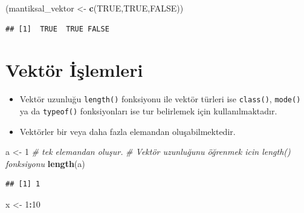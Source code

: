 \documentclass[
  oneside]{book}
\newenvironment{Shaded}{\begin{snugshade}}{\end{snugshade}}
\newcommand{\CommentTok}[1]{\textcolor[rgb]{0.56,0.35,0.01}{\textit{#1}}}
\newcommand{\ConstantTok}[1]{\textcolor[rgb]{0.56,0.35,0.01}{#1}}
\newcommand{\DecValTok}[1]{\textcolor[rgb]{0.00,0.00,0.81}{#1}}
\newcommand{\FunctionTok}[1]{\textcolor[rgb]{0.13,0.29,0.53}{\textbf{#1}}}
\newcommand{\NormalTok}[1]{#1}
\newcommand{\OtherTok}[1]{\textcolor[rgb]{0.56,0.35,0.01}{#1}}
\newcommand{\SpecialCharTok}[1]{\textcolor[rgb]{0.81,0.36,0.00}{\textbf{#1}}}
\begin{document}
\begin{Shaded}
\begin{Highlighting}[]
\NormalTok{(mantiksal\_vektor }\OtherTok{\textless{}{-}} \FunctionTok{c}\NormalTok{(}\ConstantTok{TRUE}\NormalTok{,}\ConstantTok{TRUE}\NormalTok{,}\ConstantTok{FALSE}\NormalTok{))}
\end{Highlighting}
\end{Shaded}

\begin{verbatim}
## [1]  TRUE  TRUE FALSE
\end{verbatim}

\hypertarget{vektuxf6r-iux15flemleri}{%
\section{Vektör İşlemleri}\label{vektuxf6r-iux15flemleri}}

\begin{itemize}
\item
  Vektör uzunluğu \texttt{length()} fonksiyonu ile vektör türleri ise \texttt{class()}, \texttt{mode()} ya da \texttt{typeof()} fonksiyonları ise tur belirlemek için kullanılmaktadır.
\item
  Vektörler bir veya daha fazla elemandan oluşabilmektedir.
\end{itemize}

\begin{Shaded}
\begin{Highlighting}[]
\NormalTok{a }\OtherTok{\textless{}{-}} \DecValTok{1}  \CommentTok{\# tek elemandan oluşur.}
\CommentTok{\# Vektör uzunluğunu öğrenmek icin length() fonksiyonu}
\FunctionTok{length}\NormalTok{(a)}
\end{Highlighting}
\end{Shaded}

\begin{verbatim}
## [1] 1
\end{verbatim}

\begin{Shaded}
\begin{Highlighting}[]
\NormalTok{x }\OtherTok{\textless{}{-}} \DecValTok{1}\SpecialCharTok{:}\DecValTok{10}
\end{Highlighting}
\end{Shaded}
\end{document}
